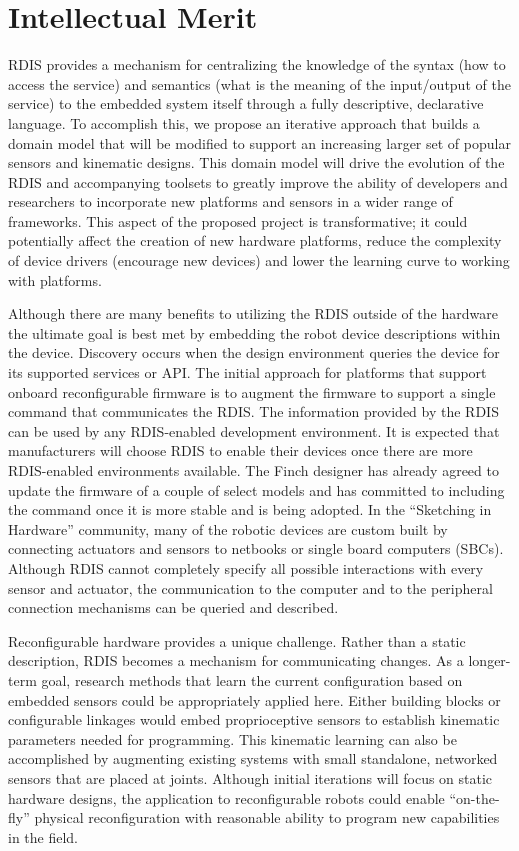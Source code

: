 
\section{Intellectual Merit}\label{sec:im}

RDIS provides a mechanism for centralizing the knowledge of the syntax (how to access the service) and semantics (what is the meaning of the input/output of the service) to the embedded system itself through a fully descriptive, declarative language.   To accomplish this, we propose an iterative approach that builds a domain model that will be modified to support an increasing larger set of popular sensors and kinematic designs.   This domain model will drive the evolution of the RDIS and accompanying toolsets to greatly improve the ability of developers and researchers to incorporate new platforms and sensors in a wider range of frameworks.  This aspect of the proposed project is transformative; it could potentially affect the creation of new hardware platforms, reduce the complexity of device drivers (encourage new devices) and lower the learning curve to working with platforms. 

Although there are many benefits to utilizing the RDIS outside of the hardware the ultimate goal  is best met by embedding the robot device descriptions within the device.  Discovery occurs when the design environment queries the device for its supported services or API.  The initial approach for platforms that support onboard reconfigurable firmware is to augment the firmware to support a single command that communicates the RDIS.  The information provided by the RDIS can be used by any RDIS-enabled development environment.  It is expected that manufacturers will choose RDIS to enable their devices once there are more RDIS-enabled environments available.  The Finch designer has already agreed to update the firmware of a couple of select models and has committed to including the command once it is more stable and is being adopted.  In the ``Sketching in Hardware'' community, many of the robotic devices are custom built by connecting actuators and sensors to netbooks or single board computers (SBCs).  Although RDIS cannot completely specify all possible interactions with every sensor and actuator, the communication to the computer and to the peripheral connection mechanisms can be queried and described. 

Reconfigurable hardware provides a unique challenge.  Rather than a static description, RDIS becomes a mechanism for communicating changes.  As a longer-term goal, research methods that learn the current configuration based on embedded sensors could be appropriately applied here. Either building blocks or configurable linkages would embed proprioceptive sensors to establish kinematic parameters needed for programming.  This kinematic learning can also be accomplished by augmenting existing systems with small standalone, networked sensors that are placed at joints.   Although initial iterations will focus on static hardware designs, the application to reconfigurable robots could enable ``on-the-fly'' physical reconfiguration with reasonable ability to program new capabilities in the field.
